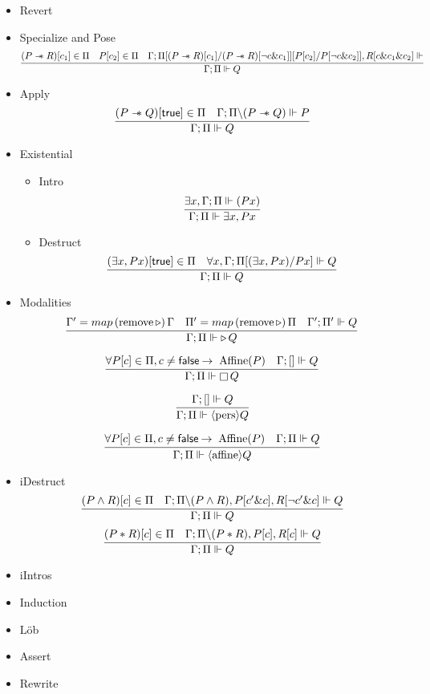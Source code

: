{\begin{itemize}
  \begin{equation*}
  \infer{\entailsD P \imp Q}
        {\SpatD = [] &
          \entails {\IntuD} {\SpatD , \affine P[\true]} {Q} &
        }
   \quad
  \infer{\entailsD P \imp Q}
        {\Persistent P &
         \entails {\IntuD} {\SpatD , \affine P[\true]} {Q} &
        }
  \end{equation*}
\item Revert
\item Specialize and Pose
  \[
  \infer{\entailsD Q}
        {(P \wand R)[c_1] \in \SpatD &
         P[c_2] \in \SpatD &
         \entails{\IntuD}{\SpatD [(P \wand R)[c_1] /
                                  (P \wand R)[\neg c \& c_1]]
                                 [P[c_2] / P [\neg c \& c_2]],
                                 R[c \& c_1 \& c_2]}}
  \]
\item Apply
  \[
  \infer{\entailsD Q}
        {(P \wand Q)[\true] \in \SpatD &
         \entails \IntuD {\SpatD \backslash (P \wand Q)} {P}}
  \]
\item Existential
  \begin{itemize}
  \item Intro
    \[
    \infer{\entailsD \exists x, P x}
          {\exists x, \entailsD (P x)}
    \]
  \item Destruct
    \[
    \infer{\entailsD Q}
          {(\exists x, P x)[\true] \in \SpatD &
           \forall x, \entails \IntuD {\SpatD [(\exists x, P x) / P x]} Q}
    \]
  \end{itemize}
\item Modalities
  \[
  \infer{\entailsD {\later Q}}
        {\IntuD' = \mathop{map} {(\text{remove} \later)}\, {\IntuD}  &
         {\SpatD}' = \mathop{map} {(\text{remove} \later)}\, {\SpatD}  &
         \entails {\IntuD'} {\SpatD'} {Q}}
  \]

  \[
  \infer{\entailsD {\intuit Q}}
        {\forall P[c] \in \SpatD, c \neq \false \imp \Affine P &
         \entails \IntuD {[]} Q}
  \]

  \[
  \infer{\entailsD {\pers Q}}
        {\entails \IntuD {[]} Q}
  \]

  \[
  \infer{\entailsD {\affine Q}}
        {\forall P[c] \in \SpatD, c \neq \false \imp \Affine P &
         \entailsD Q}
  \]
\item iDestruct
  \[
  \infer{\entailsD Q}
        {(P \wedge R)[c] \in \SpatD &
         \entails {\IntuD}
                  {\SpatD \backslash (P \wedge R), P[c' \& c], R [\neg c' \& c]}
                  {Q}}
  \]
  \[
  \infer{\entailsD Q}
        {(P \ast R)[c] \in \SpatD &
         \entails {\IntuD} {\SpatD \backslash (P \ast R), P[c], R [c]} Q}
  \]
\item iIntros
\item Induction
\item Löb
\item Assert
\item Rewrite
\end{itemize}

}
